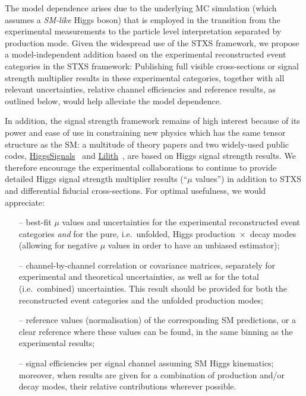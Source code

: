 \documentclass[a4paper,aps,prd,longbibliography,notitlepage,showpacs,amsmath,amssymb,superscriptaddress,nofootinbib,floatfix,11pt,preprintnumbers]{revtex4-1-mod}
\newcommand{\higgssignals}{\textsf{HiggsSignals}\xspace}
\newcommand{\lilith}{\textsf{Lilith}\xspace}
\newcommand{\ie}{i.e.\xspace}
\renewcommand{\emph}[1]{\textit{#1}}
\begin{document}
The model dependence arises due to the underlying MC simulation (which assumes a \emph{SM-like} Higgs boson) that is employed in the transition from the experimental measurements to the particle level interpretation separated by production mode. Given the widespread use of the STXS framework, we propose a model-independent addition based on the experimental reconstructed event categories in the STXS framework: Publishing full visible cross-sections or signal strength multiplier results in these experimental categories, together with all relevant uncertainties, relative channel efficiencies and reference results, as outlined below, would help alleviate the model dependence.

In addition, the signal strength framework remains of high interest because of its power and ease of use in constraining new physics which has the same tensor structure as the SM:
a multitude of theory papers and two widely-used public codes,  \href{https://higgsbounds.hepforge.org/}{\higgssignals}~\cite{Bechtle:2013xfa} and \href{https://github.com/sabinekraml/Lilith-2}{\lilith}~\cite{Bernon:2015hsa,Kraml:2019sis}, are based on Higgs signal strength results. We therefore encourage the experimental collaborations to continue to provide detailed Higgs signal strength multiplier results (``$\mu$ values'') in addition to STXS and differential fiducial cross-sections.
For optimal usefulness, we would appreciate:
\begin{itemize}
    \item[--] best-fit $\mu$ values and uncertainties for the experimental reconstructed event categories \emph{and} for the pure, \ie~unfolded, Higgs production~$\times$~decay modes (allowing for negative $\mu$ values in order to have an unbiased estimator);
    \item[--] channel-by-channel correlation or covariance matrices, separately for experimental and theoretical uncertainties, as well as for the total (\ie~combined) uncertainties. This result should be provided for both the reconstructed event categories and the unfolded  production modes;
    \item[--] reference values (normalisation) of the corresponding SM predictions, or a clear reference where these values can be found, in the same binning as the experimental results;
    \item[--] signal efficiencies per signal channel %
    assuming SM Higgs kinematics; moreover, when results are given for a combination of production and/or decay modes, their relative contributions wherever possible.
\end{itemize}
\end{document}

